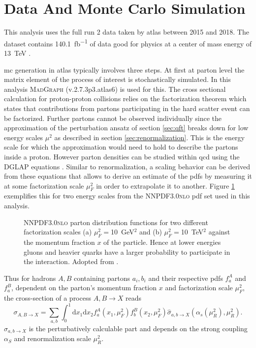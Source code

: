 \section{Data And Monte Carlo Simulation}\label{sec:mc_simulation}
This analysis uses the full run 2 data taken by \ac{atlas} between 2015 and 2018. The dataset contains \qty[]{140.1}{fb^{-1}} of data good for physics at a center of mass energy of \qty[]{13}{TeV} \citep{DAPR-2021-01}.

\ac{mc} generation in \ac{atlas} typically involves three steps. At first at parton level the matrix element of the process of interest is stochastically simulated. In this analysis \textsc{MadGraph} (v.2.7.3p3.atlas6) \citep{alwall2014automated} is used for this. The cross sectional calculation for proton-proton collisions relies on the factorization theorem \citep{halzen1984introductory} which states that contributions from partons participating in the hard scatter event can be factorized. Further partons cannot be observed individually since the approximation of the perturbation ansatz of section \ref{sec:qft} breaks down for low energy scales $\mu^2$ as described in section \ref{sec:renormalization}. This is the energy scale for which the approximation would need to hold to describe the partons inside a proton. However parton densities can be studied within \ac{qcd} using the DGLAP equations \citep{thomson2013modern}. Similar to renormalization, a scaling behavior can be derived from these equations that allows to derive an estimate of the \acp{pdf} by measuring it at some factorization scale $\mu_F^2$ in order to extrapolate it to another. Figure \ref{fig:pdf} exemplifies this for two energy scales from the \textsc{NNPDF3.0nlo} \ac{pdf} set used in this analysis.
\begin{figure}
    \centering
    \caption[]{\textsc{NNPDF3.0nlo} parton distribution functions for two different factorization scales (a) $\mu_F^2=$\qty{10}{GeV}$^2$ and (b) $\mu_F^2=$\qty{10}{TeV}$^2$ against the momentum fraction $x$ of the particle. Hence at lower energies gluons and heavier quarks have a larger probability to participate in the interaction. Adopted from \citep{PhysRevD.98.030001}.}
    \label{fig:pdf}
\end{figure}
Thus for hadrons $A,B$ containing partons $a_i,b_i$ and their respective \acp{pdf} $f_{a}^A$ and $f_{a}^B$, dependent on the parton's momentum fraction $x$ and factorization scale $\mu_F^2$, the cross-section of a process $A,B\rightarrow X$ reads
\begin{equation}
    \sigma_{A,B\rightarrow X} = \sum_{a,b} \int_0^1 \text{d}x_1\text{d}x_2 f_a^A(x_1,\mu_F^2) f_b^B(x_2,\mu_F^2) \hat{\sigma}_{a,b\rightarrow X}(\alpha_s(\mu_R^2),\mu_R^2).
\end{equation}
$\hat{\sigma}_{a,b\rightarrow X}$ is the perturbatively calculable part and depends on the strong coupling $\alpha_S$ and renormalization scale $\mu_R^2$.

